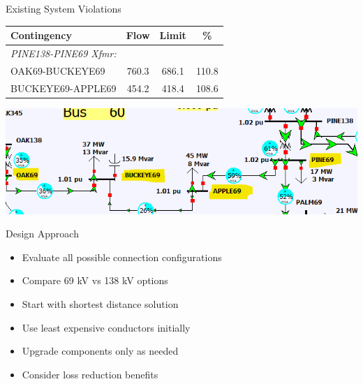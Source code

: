 \documentclass{beamer}
\begin{document}
	\begin{frame}{Existing System Violations}
		\begin{table}
			\centering
			\begin{tabular}{|l|c|c|c|}
				\hline
				\textbf{Contingency} & \textbf{Flow} & \textbf{Limit} & \textbf{\%} \\
				\hline
				\textit{PINE138-PINE69 Xfmr:} & & & \\
				OAK69-BUCKEYE69 & 760.3 & 686.1 & 110.8 \\
				BUCKEYE69-APPLE69 & 454.2 & 418.4 & 108.6 \\
				\hline
			\end{tabular}
		\end{table}
		\centering
		\includegraphics[width=0.7\linewidth]{figures/base_violations}
	\end{frame}
	
	\begin{frame}{Design Approach}
		\begin{itemize}
			\item Evaluate all possible connection configurations
			\item Compare 69 kV vs 138 kV options
			\item Start with shortest distance solution
			\item Use least expensive conductors initially
			\item Upgrade components only as needed
			\item Consider loss reduction benefits
		\end{itemize}
	\end{frame}
	
\end{document}
